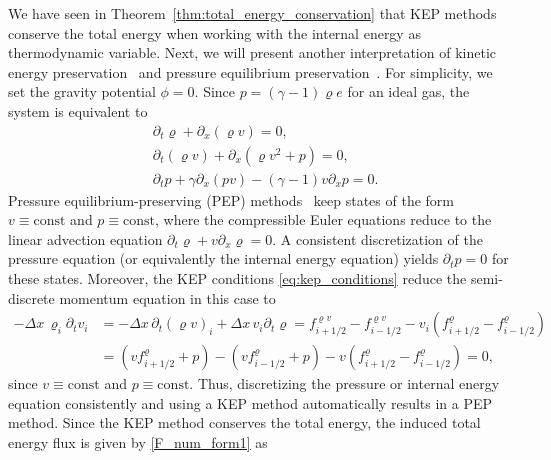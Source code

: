 \documentclass[]{scrartcl}
\theoremstyle{definition}
\begin{document}
We have seen in Theorem~\ref{thm:total_energy_conservation} that KEP methods conserve the total energy when working with the internal energy as thermodynamic variable.
Next, we will present another interpretation of kinetic energy preservation~\cite{Jameson2008,Kuya2018,Ranocha2020,Ranocha2022, ranocha2018thesis} and pressure equilibrium preservation~\cite{Shima2021,Ranocha2022}.
For simplicity, we set the gravity potential $\phi = 0$.
Since $p = (\gamma - 1) \varrho e$ for an ideal gas, the system is equivalent to
\begin{equation}
\begin{aligned}
    &\partial_t \varrho + \partial_x (\varrho v) = 0,\\
    &\partial_t (\varrho v) + \partial_x ( \varrho v^2 + p) = 0,\\
    &\partial_t p + \gamma \partial_x (p v) - (\gamma - 1) v \partial_x p = 0.
    \label{euler_noncons_pressure}
\end{aligned}
\end{equation}
Pressure equilibrium-preserving (PEP) methods~\cite{Shima2021,Ranocha2022} keep states of the form $v \equiv \mathrm{const}$ and $p \equiv \mathrm{const}$, where the compressible Euler equations reduce to the linear advection equation $\partial_t \varrho + v \partial_x \varrho = 0$.
A consistent discretization of the pressure equation (or equivalently the internal energy equation) yields $\partial_t p = 0$ for these states.
Moreover, the KEP conditions \eqref{eq:kep_conditions} reduce the semi-discrete momentum equation in this case to
\begin{equation}
\begin{aligned}
    -\Delta x \, \varrho_i \partial_t v_i
    &=
    - \Delta x \, \partial_t (\varrho v)_i
    + \Delta x \, v_i \partial_t \varrho
    =
    f^{\varrho v}_{i+1/2} - f^{\varrho v}_{i-1/2}
    - v_i \left ( f^{\varrho}_{i+1/2} - f^{\varrho}_{i-1/2} \right )
    \\
    &=
    \left( v f^{\varrho}_{i + 1/2} + p \right)
    - \left( v f^{\varrho}_{i-1/2} + p  \right)
    - v \left ( f^{\varrho}_{i+1/2} - f^{\varrho}_{i-1/2} \right )
    =
    0,
\end{aligned}
\end{equation}
since $v \equiv \mathrm{const}$ and $p \equiv \mathrm{const}$.
Thus, discretizing the pressure or internal energy equation consistently and using a KEP method automatically results in a PEP method.
Since the KEP method conserves the total energy, the induced total energy flux is given by \eqref{F_num_form1} as
\end{document}
